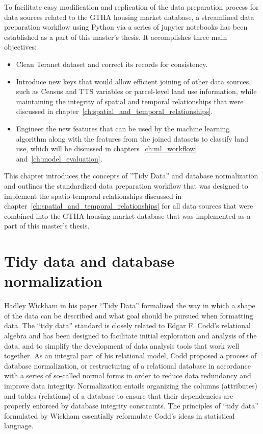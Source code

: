 To facilitate easy modification and replication of the data preparation process for data sources related to the GTHA housing market database, a streamlined data preparation workflow using Python via a series of jupyter notebooks has been established as a part of this master's thesis.
It accomplishes three main objectives:
\begin{itemize}
    \item Clean Teranet dataset and correct its records for consistency.
    \item Introduce new keys that would allow efficient joining of other data sources, such as Census and TTS variables or parcel-level land use information, while maintaining the integrity of spatial and temporal relationships that were discussed in chapter~\ref{ch:spatial_and_temporal_relationships}.
    \item Engineer the new features that can be used by the machine learning algorithm along with the features from the joined datasets to classify land use, which will be discussed in chapters~\ref{ch:ml_workflow} and~\ref{ch:model_evaluation}.
\end{itemize}

This chapter introduces the concepts of ''Tidy Data'' and database normalization and outlines the standardized data preparation workflow that was designed to implement the spatio-temporal relationships discussed in chapter~\ref{ch:spatial_and_temporal_relationships} for all data sources that were combined into the GTHA housing market database that was implemented as a part of this master's thesis.

\section{Tidy data and database normalization} \label{sec:db_norm_tidy_data}

Hadley Wickham in his paper ``Tidy Data''\cite{Wickham2014} formalized the way in which a shape of the data can be described and what goal should be pursued when formatting data.
The ``tidy data'' standard is closely related to Edgar F. Codd's relational algebra and has been designed to facilitate initial exploration and analysis of the data, and to simplify the development of data analysis tools that work well together.
As an integral part of his relational model, Codd\cite{Codd1990} proposed a process of database normalization, or restructuring of a relational database in accordance with a series of so-called normal forms in order to reduce data redundancy and improve data integrity.
Normalization entails organizing the columns (attributes) and tables (relations) of a database to ensure that their dependencies are properly enforced by database integrity constraints.
The principles of ``tidy data'' formulated by Wickham essentially reformulate Codd's ideas in statistical language.

